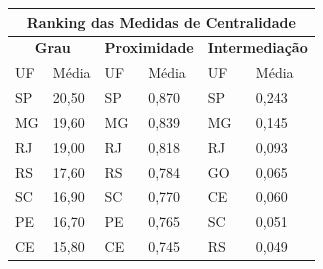 \begin{table}[H]
	\centering
	\begin{tabular}{|l|l|l|l|l|l|}
		\hline
		\multicolumn{6}{|c|}{\textbf{Ranking das Medidas de Centralidade}}                                                                                                                                                        \\ \hline
		\multicolumn{2}{|c|}{\cellcolor[HTML]{C0C0C0}\textbf{Grau}} & \multicolumn{2}{c|}{\cellcolor[HTML]{C0C0C0}\textbf{Proximidade}}            & \multicolumn{2}{c|}{\cellcolor[HTML]{C0C0C0}\textbf{Intermediação}}          \\ \hline
		UF                          & Média                         & UF                                  & Média                                  & UF                                  & Média                                  \\ \hline
		SP                          & 20,50                         & SP                                  & 0,870                                  & SP                                  & 0,243                                  \\ \hline
		MG                          & 19,60                         & MG                                  & 0,839                                  & MG                                  & 0,145                                  \\ \hline
		RJ                          & 19,00                         & RJ                                  & 0,818                                  & RJ                                  & 0,093                                  \\ \hline
		RS                          & 17,60                         & RS                                  & 0,784                                  & GO                                  & 0,065                                  \\ \hline
		SC                          & 16,90                         & SC                                  & 0,770                                  & CE                                  & 0,060                                  \\ \hline
		PE                          & 16,70                         & PE                                  & 0,765                                  & SC                                  & 0,051                                  \\ \hline
		CE                          & 15,80                         & CE                                  & 0,745                                  & RS                                  & 0,049                                  \\ \hline

\end{tabular}
\end{table}
